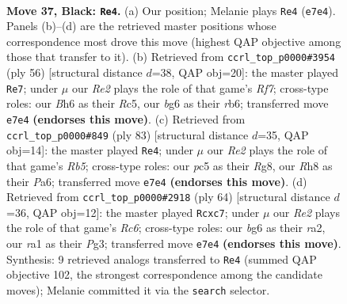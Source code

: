 \documentclass[11pt]{article}
\begin{document}
\clearpage

\begin{figure}[p]\centering
\begin{subfigure}{0.46\textwidth}\centering
\resizebox{\linewidth}{!}{%
\newchessgame
\chessboard[
  setfen={1k5r/4rP2/p5Bb/2P2R2/1P5p/8/5K2/R7 b - - 2 37},
  showmover=false,
  pgfstyle=straightmove, color=movearrow, markmove={e7-e4}
]}
\caption{}
\end{subfigure}\hfill
\begin{subfigure}{0.46\textwidth}\centering
\resizebox{\linewidth}{!}{%
\newchessgame
\chessboard[
  setfen={1k5r/pp3Rp1/1r2P1p1/2R5/8/P1P2K2/8/8 w - - 1 29},
  showmover=false,
  pgfstyle=straightmove, color=movearrow, markmove={f7-e7}
]}
\caption{}
\end{subfigure}
\\[4pt]
\begin{subfigure}{0.46\textwidth}\centering
\resizebox{\linewidth}{!}{%
\newchessgame
\chessboard[
  setfen={6r1/7k/pB6/P3b3/1r6/8/5R1P/3R3K b - - 0 42},
  showmover=false,
  pgfstyle=straightmove, color=movearrow, markmove={b4-e4}
]}
\caption{}
\end{subfigure}\hfill
\begin{subfigure}{0.46\textwidth}\centering
\resizebox{\linewidth}{!}{%
\newchessgame
\chessboard[
  setfen={r4k2/1Rb3p1/p1R5/4p3/8/5PP1/r7/4K3 w - - 0 33},
  showmover=false,
  pgfstyle=straightmove, color=movearrow, markmove={c6-c7}
]}
\caption{}
\end{subfigure}
\caption{\textbf{Move 37, Black: \texttt{Re4}.} (a) Our position; Melanie plays \texttt{Re4} (\texttt{e7e4}). Panels (b)--(d) are the retrieved master positions whose correspondence most drove this move (highest QAP objective among those that transfer to it). (b) Retrieved from \texttt{ccrl\_top\_p0000\#3954} (ply 56) [structural distance $d$=38, QAP obj=20]: the master played \texttt{Re7}; under $\mu$ our \emph{Re2} plays the role of that game's \emph{Rf7}; cross-type roles: our \emph{B}h6 as their \emph{R}c5, our \emph{b}g6 as their \emph{r}b6; transferred move \texttt{e7e4} \textbf{(endorses this move)}. (c) Retrieved from \texttt{ccrl\_top\_p0000\#849} (ply 83) [structural distance $d$=35, QAP obj=14]: the master played \texttt{Re4}; under $\mu$ our \emph{Re2} plays the role of that game's \emph{Rb5}; cross-type roles: our \emph{p}c5 as their \emph{R}g8, our \emph{R}h8 as their \emph{P}a6; transferred move \texttt{e7e4} \textbf{(endorses this move)}. (d) Retrieved from \texttt{ccrl\_top\_p0000\#2918} (ply 64) [structural distance $d$=36, QAP obj=12]: the master played \texttt{Rcxc7}; under $\mu$ our \emph{Re2} plays the role of that game's \emph{Rc6}; cross-type roles: our \emph{b}g6 as their \emph{r}a2, our \emph{r}a1 as their \emph{P}g3; transferred move \texttt{e7e4} \textbf{(endorses this move)}. Synthesis: 9 retrieved analogs transferred to \texttt{Re4} (summed QAP objective 102, the strongest correspondence among the candidate moves); Melanie committed it via the \texttt{search} selector.}
\label{fig:thought-m73}
\end{figure}
\end{document}
